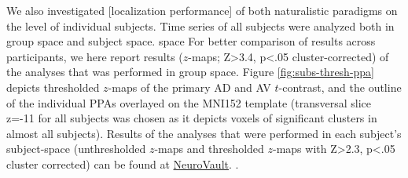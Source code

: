\documentclass[english]{article}
\begin{document}
We also investigated [localization performance] of both naturalistic paradigms
on the level of individual subjects.
Time series of all subjects were analyzed both in group space and subject space.
 space
For better comparison of results across participants, we here report results
($z$-maps; Z>3.4, p<.05 cluster-corrected) of the analyses that was performed in
group space.
Figure \ref{fig:subs-thresh-ppa} depicts thresholded $z$-maps of the primary AD
and AV $t$-contrast, and the outline of the individual PPAs
\citep{sengupta2016extension} overlayed on the MNI152 template (transversal
slice z=-11 for all subjects was chosen as it depicts voxels of significant
clusters in almost all subjects).
Results of the analyses that were performed in each subject's subject-space
(unthresholded $z$-maps and thresholded $z$-maps with Z>2.3, p<.05 cluster
corrected) can be found at
\href{https://neurovault.org/collections/KADGMGVZ/}{NeuroVault}. .

\end{document}
